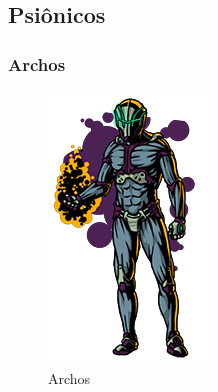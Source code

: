 \documentclass[11pt]{article} %
\begin{document}
\subsection{Psiônicos}

\subsubsection{Archos}

\begin{figure}[!htp]
\centering
\includegraphics[scale=0.5]{res/characters/Archos.png}
\caption{Archos}
\label{Archos}
\end{figure}
\end{document}
